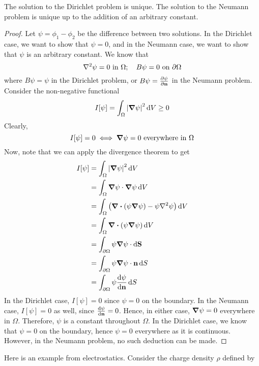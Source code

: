 \documentclass{article}
\begin{document}
\begin{proposition}
	The solution to the Dirichlet problem is unique. The solution to the Neumann problem is unique up to the addition of an arbitrary constant.
\end{proposition}
\begin{proof}
	Let $\psi = \phi_1 - \phi_2$ be the difference between two solutions. In the Dirichlet case, we want to show that $\psi = 0$, and in the Neumann case, we want to show that $\psi$ is an arbitrary constant. We know that
	\[ \laplacian{\psi} = 0 \text{ in } \Omega;\quad B\psi = 0 \text{ on } \partial\Omega \]
	where $B\psi = \psi$ in the Dirichlet problem, or $B\psi = \pdv{\psi}{\vb n}$ in the Neumann problem. Consider the non-negative functional
	\[ I[\psi] = \int_\Omega \abs{\grad{\psi}}^2 \dd{V} \geq 0 \]
	Clearly,
	\[ I[\psi] = 0 \iff \grad{\psi} = 0 \text{ everywhere in } \Omega \]
	Now, note that we can apply the divergence theorem to get
	\begin{align*}
		I[\psi] & = \int_\Omega \abs{\grad{\psi}}^2 \dd{V}                                          \\
		        & = \int_\Omega \grad{\psi} \cdot \grad{\psi} \dd{V}                                \\
		        & = \int_\Omega \left( \div(\psi \grad{\psi}) - \psi\laplacian{\psi} \right) \dd{V} \\
		        & = \int_\Omega \div(\psi \grad{\psi}) \dd{V}                                       \\
		        & = \int_{\partial\Omega} \psi \grad{\psi} \cdot\dd{\vb S}                          \\
		        & = \int_{\partial\Omega} \psi \grad{\psi} \cdot \vb n \dd{S}                       \\
		        & = \int_{\partial\Omega} \psi \dv{\psi}{\vb n} \dd{S}                              \\
	\end{align*}
	In the Dirichlet case, $I[\psi] = 0$ since $\psi = 0$ on the boundary. In the Neumann case, $I[\psi] = 0$ as well, since $\dv{\psi}{\vb n} = 0$. Hence, in either case, $\grad{\psi} = 0$ everywhere in $\Omega$. Therefore, $\psi$ is a constant throughout $\Omega$. In the Dirichlet case, we know that $\psi = 0$ on the boundary, hence $\psi = 0$ everywhere as it is continuous. However, in the Neumann problem, no such deduction can be made.
\end{proof}
\noindent Here is an example from electrostatics. Consider the charge density $\rho$ defined by
\end{document}
